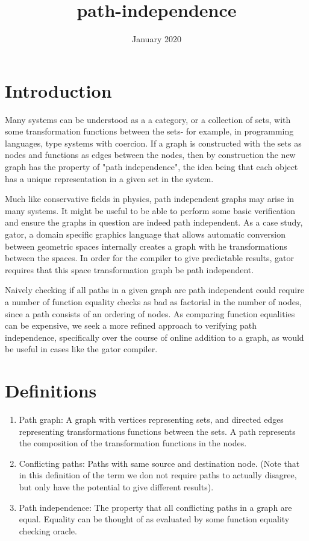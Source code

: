 \documentclass{article}
\title{path-independence}
\author{ }
\date{January 2020}
\begin{document}
\maketitle

\section{Introduction}

Many systems can be understood as a a category, or a collection of sets, with some transformation functions between the sets- for example, in programming languages, type systems with coercion. If a graph is constructed with the sets as nodes and functions as edges between the nodes, then by construction the new graph has the property of "path independence", the idea being that each object has a unique representation in a given set in the system.

Much like conservative fields in physics, path independent graphs may arise in many systems. It might be useful to be able to perform some basic verification and ensure the graphs in question are indeed path independent. As a case study, gator, a domain specific graphics language that allows automatic conversion between geometric spaces internally creates a graph with he transformations between the spaces. 
In order for the compiler to give predictable results, gator requires that this space transformation graph be path independent.

Naively checking if all paths in a given graph are path independent could require a number of function equality checks as bad as factorial in the number of nodes, since a path consists of an ordering of nodes. As comparing function equalities can be expensive, we seek a more refined approach to verifying path independence, specifically over the course of online addition to a graph, as would be useful in cases like the gator compiler.


\section{Definitions}
\begin{enumerate}
    \item Path graph: A graph with vertices representing sets, and directed edges representing transformations functions between the sets. A path represents the composition of the transformation functions in the nodes.
    \item Conflicting paths: Paths with same source and destination node. (Note that in this definition of the term we don not require paths to actually disagree, but only have the potential to give different results).
    \item Path independence: The property that all conflicting paths in a graph are equal. Equality can be thought of as evaluated by some function equality checking oracle.
\end{enumerate}
\end{document}
